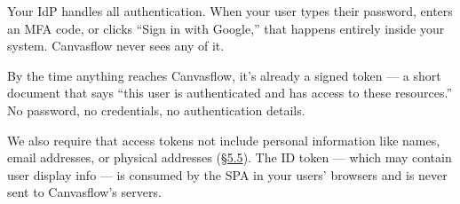 Your IdP handles all authentication. When your user types their password, enters an MFA
code, or clicks ``Sign in with Google,'' that happens entirely inside your system.
Canvasflow never sees any of it.

By the time anything reaches Canvasflow, it's already a signed token --- a short document
that says ``this user is authenticated and has access to these resources.'' No password,
no credentials, no authentication details.

We also require that access tokens not include personal information like names, email
addresses, or physical addresses (\hyperref[sec:prohibited]{\S5.5}). The ID token --- which may contain user display
info --- is consumed by the SPA in your users' browsers and is never sent to Canvasflow's
servers.

